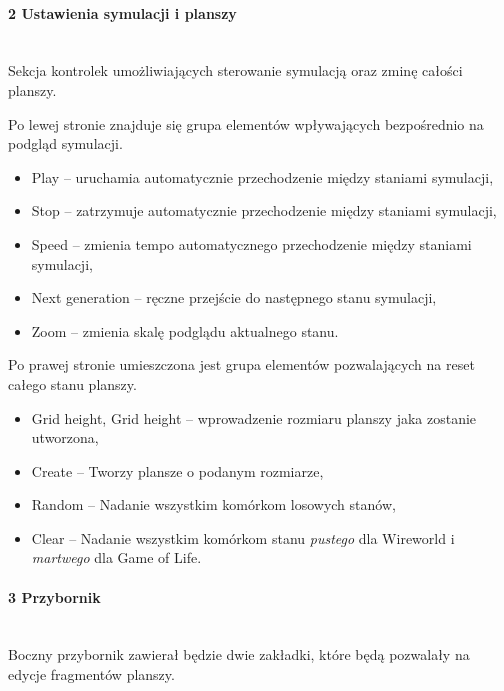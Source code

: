 \documentclass{report}
\begin{document}
\paragraph{2 Ustawienia symulacji i planszy} \mbox{} \\
Sekcja kontrolek umożliwiających sterowanie symulacją oraz zminę całości planszy.

Po lewej stronie znajduje się grupa elementów wpływających bezpośrednio na podgląd symulacji.
\begin{itemize}
    \item Play -- uruchamia automatycznie przechodzenie między staniami symulacji,
    \item Stop -- zatrzymuje automatycznie przechodzenie między staniami symulacji,
    \item Speed -- zmienia tempo automatycznego przechodzenie między staniami symulacji,
    \item Next generation -- ręczne przejście do następnego stanu symulacji,
    \item Zoom -- zmienia skalę podglądu aktualnego stanu.
\end{itemize}

Po prawej stronie umieszczona jest grupa elementów pozwalających na reset całego stanu planszy.
\begin{itemize}
    \item Grid height, Grid height -- wprowadzenie rozmiaru planszy jaka zostanie utworzona,
    \item Create -- Tworzy plansze o podanym rozmiarze,
    \item Random -- Nadanie wszystkim komórkom losowych stanów,
    \item Clear -- Nadanie wszystkim komórkom stanu \textit{pustego} dla Wireworld i \textit{martwego} dla Game of Life.
\end{itemize}

\paragraph{3 Przybornik} \mbox{} \\
Boczny przybornik zawierał będzie dwie zakładki, które będą pozwalały na edycje fragmentów planszy.
\end{document}
